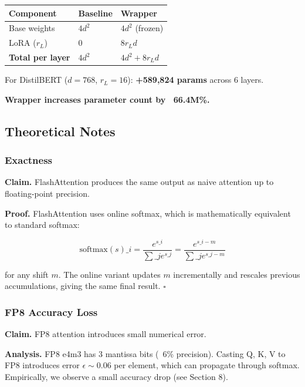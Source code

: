 \begin{table}[H]
\centering
\small
\begin{tabular}{lll}
\toprule
\textbf{Component} & \textbf{Baseline} & \textbf{Wrapper} \\
\midrule
Base weights & $4 d^2$ & $4 d^2$ (frozen) \\
LoRA ($r_L$) & 0 & $8 r_L d$ \\
\textbf{Total per layer} & $4 d^2$ & $4 d^2 + 8 r_L d$ \\
\bottomrule
\end{tabular}
\end{table}

For DistilBERT ($d=768$, $r_L=16$): \textbf{+589,824 params} across 6 layers.

\textbf{Wrapper increases parameter count by ~66.4M\%.}

\subsection{Theoretical Notes}

\subsubsection{Exactness}

\textbf{Claim.} FlashAttention produces the same output as naive attention up to 
floating-point precision.

\textbf{Proof.} FlashAttention uses online softmax, which is mathematically 
equivalent to standard softmax:

\[
\text{softmax}(s)\_i = \frac{e^{s\_i}}{\sum\_j e^{s\_j}} = \frac{e^{s\_i - m}}{\sum\_j e^{s\_j - m}}
\tag{4.5}
\]

for any shift $m$. The online variant updates $m$ incrementally and rescales 
previous accumulations, giving the same final result. $\square$

\subsubsection{FP8 Accuracy Loss}

\textbf{Claim.} FP8 attention introduces small numerical error.

\textbf{Analysis.} FP8 e4m3 has 3 mantissa bits (~6\% precision). Casting Q, K, V 
to FP8 introduces error $\epsilon \sim 0.06$ per element, which can propagate 
through softmax. Empirically, we observe a small accuracy drop (see Section 8).

